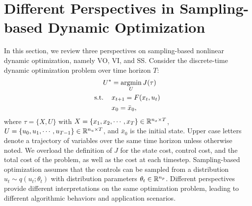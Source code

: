 \documentclass[twoside,11pt]{article}
\begin{document}
\section{Different Perspectives in Sampling-based Dynamic Optimization}
\label{sec: sampling_opt}

In this section, we review three perspectives on sampling-based nonlinear dynamic optimization, namely \ac{VO}, \ac{VI}, and \acl{SS}. Consider the discrete-time dynamic optimization problem over time horizon $T$:
\begin{equation} \label{eq: dyn_opt}
\begin{split}
U^* & = \argmin_U J(\tau)\\
\text{s.t.}\hspace{3mm} \ & x_{t+1} = F(x_t, u_t)\\
& x_0 = \bar{x}_0,
\end{split}
\end{equation}
where $\tau = \{X, U\}$ with $X=\{x_1, x_2, \cdots, x_T\}\in\mathbb{R}^{n_x\times T}$, $U=\{u_0, u_1, \cdots, u_{T-1}\}\in\mathbb{R}^{n_u\times T}$, and $\bar{x}_0$ is the initial state. Upper case letters denote a trajectory of variables over the same time horizon unless otherwise noted. We overload the definition of $J$ for the state cost, control cost, and the total cost of the problem, as well as the cost at each timestep. Sampling-based optimization assumes that the controls can be sampled from a distribution $u_t \sim q(u_t;\theta_t)$ with distribution parameters $\theta_t\in\mathbb{R}^{n_p}$. Different perspectives provide different interpretations  on the same optimization problem, leading to different algorithmic behaviors and application scenarios.
\end{document}
